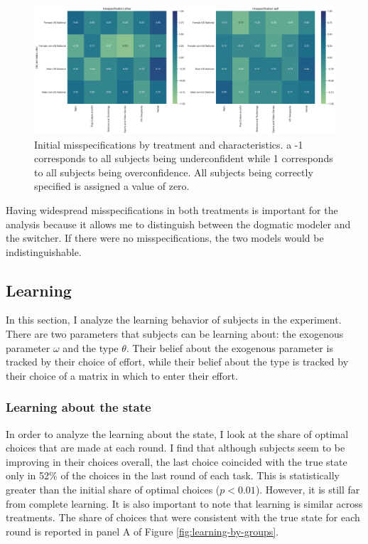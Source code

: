 \documentclass[
  12pt,
]{article}
\begin{document}
\begin{figure}
\hypertarget{fig:misspecification-by-treatment}{%
\centering
\includegraphics{../figures/misspecifications_characteristics_treatment.png}
\caption{Initial misspecifications by treatment and characteristics. a
-1 corresponds to all subjects being underconfident while 1 corresponds
to all subjects being overconfidence. All subjects being correctly
specified is assigned a value of
zero.}\label{fig:misspecification-by-treatment}
}
\end{figure}

Having widespread misspecifications in both treatments is important for
the analysis because it allows me to distinguish between the dogmatic
modeler and the switcher. If there were no misspecifications, the two
models would be indistinguishable.

\hypertarget{learning}{%
\subsection{Learning}\label{learning}}

In this section, I analyze the learning behavior of subjects in the
experiment. There are two parameters that subjects can be learning
about: the exogenous parameter \(\omega\) and the type \(\theta\). Their
belief about the exogenous parameter is tracked by their choice of
effort, while their belief about the type is tracked by their choice of
a matrix in which to enter their effort.

\hypertarget{learning-about-the-state}{%
\subsubsection{Learning about the
state}\label{learning-about-the-state}}

In order to analyze the learning about the state, I look at the share of
optimal choices that are made at each round. I find that although
subjects seem to be improving in their choices overall, the last choice
coincided with the true state only in 52\% of the choices in the last
round of each task. This is statistically greater than the initial share
of optimal choices (\(p<0.01\)). However, it is still far from complete
learning. It is also important to note that learning is similar across
treatments. The share of choices that were consistent with the true
state for each round is reported in panel A of Figure
\ref{fig:learning-by-groups}.
\end{document}
